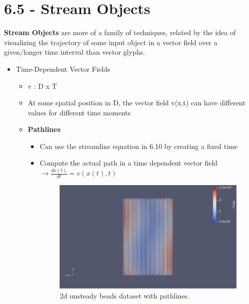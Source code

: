 \documentclass{article}
\begin{document}
\section*{6.5 - Stream Objects}
\textbf{Stream Objects} are more of a family of techniques, related by the idea of visualizing the trajectory of some input object in a vector field over a given/longer time interval than vector glyphs.

\begin{itemize}
    \item Time-Dependent Vector Fields
    \begin{itemize}
        \item v : D x T
        \item At some spatial position in D, the vector field v(x,t) can have different values for different time moments
        \item \textbf{Pathlines}
        \begin{itemize}
            \item Can use the streamline equation in 6.10 by creating a fixed time
            \item Compute the actual path in a time dependent vector field $\rightarrow \frac{dx(t)}{dt} = v(x(t), t)$
            
\begin{figure}[H]
\caption{2d unsteady beads dataset with pathlines.}
\centering
\includegraphics[scale=.4]{beads_2d_pathlines_1.png}
\end{figure}


\end{itemize}
\end{itemize}
\end{itemize}
\end{document}

